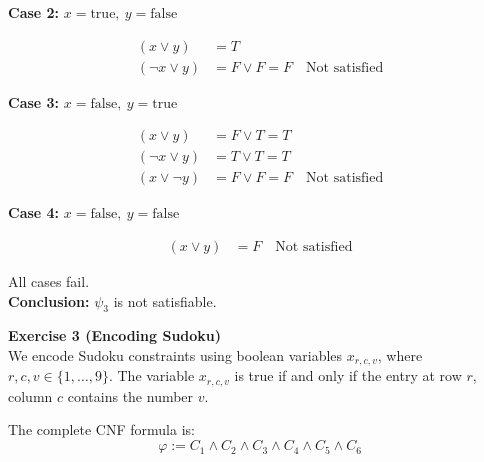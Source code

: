 \documentclass{article}
\theoremstyle{theorem}
\theoremstyle{definition}
\theoremstyle{remark}
\begin{document}
\begin{enumerate}
\begin{flushleft}
    \textbf{Case 2:} $x = \text{true},\ y = \text{false}$

    \begin{align*}
    (x \lor y) &= T \\
    (\neg x \lor y) &= F \lor F = F \quad \text{Not satisfied}
    \end{align*}

    \textbf{Case 3:} $x = \text{false},\ y = \text{true}$

    \begin{align*}
    (x \lor y) &= F \lor T = T \\
    (\neg x \lor y) &= T \lor T = T \\
    (x \lor \neg y) &= F \lor F = F \quad \text{Not satisfied}
    \end{align*}

    \textbf{Case 4:} $x = \text{false},\ y = \text{false}$

    \begin{align*}
    (x \lor y) &= F \quad \text{Not satisfied}
    \end{align*}

    All cases fail.\\
    \textbf{Conclusion:} $\psi_3$ is not satisfiable.
    \end{flushleft}
\end{enumerate}

\textbf{Exercise 3 (Encoding Sudoku)} \\

We encode Sudoku constraints using boolean variables \( x_{r,c,v} \), where \( r, c, v \in \{1, \ldots, 9\} \). The variable \( x_{r,c,v} \) is true if and only if the entry at row \( r \), column \( c \) contains the number \( v \).

The complete CNF formula is:
\[
\varphi := C_1 \land C_2 \land C_3 \land C_4 \land C_5 \land C_6
\]
\end{document}
